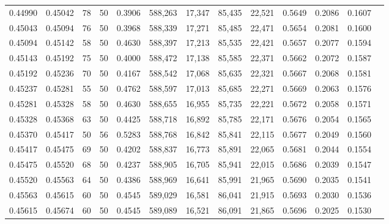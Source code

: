 \begin{tabular}{rrrrrrrrrrrrr}
0.44990 & 0.45042 &    78 &  50 &                                     0.3906 & 588,263 &  17,347 &  85,435 &  22,521 & 0.5649 & 0.2086 & 0.1607 \\
0.45043 & 0.45094 &    76 &  50 &                                     0.3968 & 588,339 &  17,271 &  85,485 &  22,471 & 0.5654 & 0.2081 & 0.1600 \\
0.45094 & 0.45142 &    58 &  50 &                                     0.4630 & 588,397 &  17,213 &  85,535 &  22,421 & 0.5657 & 0.2077 & 0.1594 \\
0.45143 & 0.45192 &    75 &  50 &                                     0.4000 & 588,472 &  17,138 &  85,585 &  22,371 & 0.5662 & 0.2072 & 0.1587 \\
0.45192 & 0.45236 &    70 &  50 &                                     0.4167 & 588,542 &  17,068 &  85,635 &  22,321 & 0.5667 & 0.2068 & 0.1581 \\
0.45237 & 0.45281 &    55 &  50 &                                     0.4762 & 588,597 &  17,013 &  85,685 &  22,271 & 0.5669 & 0.2063 & 0.1576 \\
0.45281 & 0.45328 &    58 &  50 &                                     0.4630 & 588,655 &  16,955 &  85,735 &  22,221 & 0.5672 & 0.2058 & 0.1571 \\
0.45328 & 0.45368 &    63 &  50 &                                     0.4425 & 588,718 &  16,892 &  85,785 &  22,171 & 0.5676 & 0.2054 & 0.1565 \\
0.45370 & 0.45417 &    50 &  56 &                                     0.5283 & 588,768 &  16,842 &  85,841 &  22,115 & 0.5677 & 0.2049 & 0.1560 \\
0.45417 & 0.45475 &    69 &  50 &                                     0.4202 & 588,837 &  16,773 &  85,891 &  22,065 & 0.5681 & 0.2044 & 0.1554 \\
0.45475 & 0.45520 &    68 &  50 &                                     0.4237 & 588,905 &  16,705 &  85,941 &  22,015 & 0.5686 & 0.2039 & 0.1547 \\
0.45520 & 0.45563 &    64 &  50 &                                     0.4386 & 588,969 &  16,641 &  85,991 &  21,965 & 0.5690 & 0.2035 & 0.1541 \\
0.45563 & 0.45615 &    60 &  50 &                                     0.4545 & 589,029 &  16,581 &  86,041 &  21,915 & 0.5693 & 0.2030 & 0.1536 \\
0.45615 & 0.45674 &    60 &  50 &                                     0.4545 & 589,089 &  16,521 &  86,091 &  21,865 & 0.5696 & 0.2025 & 0.1530 \\

\end{tabular}
